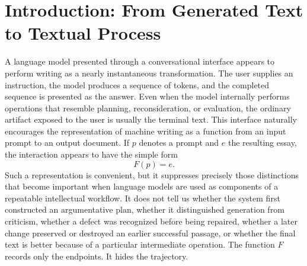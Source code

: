 \documentclass[11pt]{article}
\begin{document}
\begin{abstract}
The paper therefore treats the essay pipeline as a small experimental cognitive architecture. It develops a formal account of staged generation, externalized memory, asymmetric allocation of computational capacity, critical diagnosis, conservative revision, and provenance-preserving textual evolution. The central claim is that the epistemic value of such a system does not consist in guaranteeing better prose at every stage. Its value consists in converting an otherwise transient act of generation into an inspectable process whose intermediate commitments, criticisms, failures, and repairs remain available for comparison. A writing pipeline becomes scientifically interesting when it preserves enough of its own history for the difference between what a system noticed and what it successfully changed to become an object of analysis.

\end{abstract}


\section{Introduction: From Generated Text to Textual Process}

A language model presented through a conversational interface appears to perform writing as a nearly instantaneous transformation. The user supplies an instruction, the model produces a sequence of tokens, and the completed sequence is presented as the answer. Even when the model internally performs operations that resemble planning, reconsideration, or evaluation, the ordinary artifact exposed to the user is usually the terminal text. This interface naturally encourages the representation of machine writing as a function from an input prompt to an output document. If \(p\) denotes a prompt and \(e\) the resulting essay, the interaction appears to have the simple form
\[
    F(p)=e.
\]
Such a representation is convenient, but it suppresses precisely those distinctions that become important when language models are used as components of a repeatable intellectual workflow. It does not tell us whether the system first constructed an argumentative plan, whether it distinguished generation from criticism, whether a defect was recognized before being repaired, whether a later change preserved or destroyed an earlier successful passage, or whether the final text is better because of a particular intermediate operation. The function \(F\) records only the endpoints. It hides the trajectory.
\end{document}
